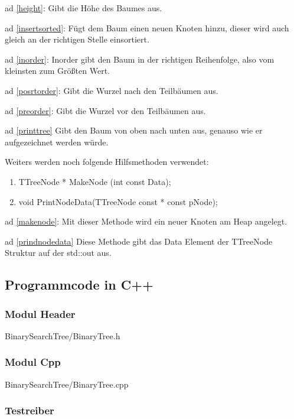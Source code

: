 \documentclass[10pt,a4paper]{scrartcl}
\begin{document}
ad \ref{height}:
Gibt die Höhe des Baumes aus.

ad \ref{insertsorted}:
Fügt dem Baum einen neuen Knoten hinzu, dieser wird auch gleich an der richtigen Stelle einsortiert.

ad \ref{inorder}:
Inorder gibt den Baum in der richtigen Reihenfolge, also vom kleinsten zum Größten Wert.

ad \ref{posrtorder}:
Gibt die Wurzel nach den Teilbäumen aus.

ad \ref{preorder}:
Gibt die Wurzel vor den Teilbäumen  aus.

ad \ref{printtree}
Gibt den Baum von oben nach unten aus, genauso wie er aufgezeichnet werden würde.


Weiters werden noch folgende Hilfsmethoden verwendet:

\begin{enumerate}
	\item TTreeNode * MakeNode (int const Data);\label{makenode}
	\item void PrintNodeData(TTreeNode const * const pNode);\label{prindnodedata}
\end{enumerate}

ad \ref{makenode}:
Mit dieser Methode wird ein neuer Knoten am Heap angelegt.

ad \ref{prindnodedata}
Diese Methode gibt das Data Element der TTreeNode Struktur auf der std::out aus.

\newpage
\subsection{Programmcode in C++}

\subsubsection{Modul Header}


{BinarySearchTree/BinaryTree.h}


\subsubsection{Modul Cpp}


{BinarySearchTree/BinaryTree.cpp}

\newpage
\subsubsection{Testreiber}
\end{document}
